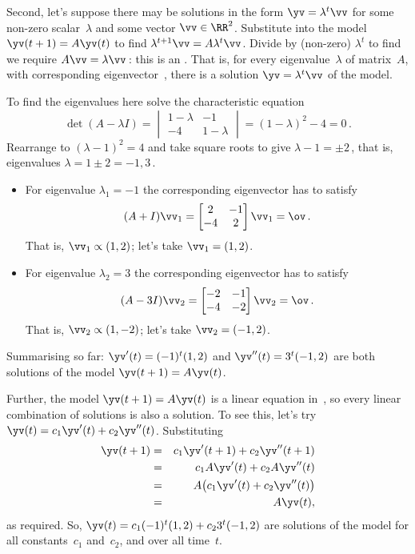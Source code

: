 \begin{example}
\begin{solution}
Second, let's suppose there may be solutions in the form \(\yv=\lambda^t\vv\) for some non-zero scalar~\(\lambda\) and some vector \(\vv\in\RR^2\).
Substitute into the model \(\yv(t+1)=A\yv(t)\) to find \(\lambda^{t+1}\vv=A\lambda^t\vv\). 
Divide by (non-zero) \(\lambda^t\) to find we require \(A\vv=\lambda\vv\)\,: this is an .
That is, for every eigenvalue~\(\lambda\) of matrix~\(A\), with corresponding eigenvector~\vv, there is a solution \(\yv=\lambda^t\vv\) of the model.

To find the eigenvalues here solve the characteristic equation 
\begin{equation*}
\det(A-\lambda I)=\begin{vmatrix} 1-\lambda&-1\\-4&1-\lambda \end{vmatrix}=(1-\lambda)^2-4=0\,.
\end{equation*}
Rearrange to \((\lambda-1)^2=4\) and take square roots to give \(\lambda-1=\pm2\)\,, that is, eigenvalues \(\lambda=1\pm2=-1,3\)\,.
\begin{itemize}
\item For eigenvalue \(\lambda_1=-1\) the corresponding eigenvector has to satisfy
\begin{equation*}
(A+I)\vv_1=\begin{bmatrix} 2&-1\\-4&2 \end{bmatrix}\vv_1=\ov\,.
\end{equation*}
That is, \(\vv_1\propto (1,2)\); let's take \(\vv_1=(1,2)\).

\item For eigenvalue \(\lambda_2=3\) the corresponding eigenvector has to satisfy
\begin{equation*}
(A-3I)\vv_2=\begin{bmatrix} -2&-1\\-4&-2 \end{bmatrix}\vv_2=\ov\,.
\end{equation*}
That is, \(\vv_2\propto (1,-2)\); let's take \(\vv_2=(-1,2)\).
\end{itemize}
Summarising so far: \(\yv'(t)=(-1)^t(1,2)\) and \(\yv''(t)=3^t(-1,2)\) are both solutions of the model \(\yv(t+1)=A\yv(t)\).

Further, the model \(\yv(t+1)=A\yv(t)\) is a linear equation in~\yv, so every linear combination of solutions is also a solution.
To see this, let's try \(\yv(t)=c_1\yv'(t)+c_2\yv''(t)\).
Substituting
\begin{eqnarray*}
\yv(t+1)&=&c_1\yv'(t+1)+c_2\yv''(t+1)
\\&=&c_1A\yv'(t)+c_2A\yv''(t)
\\&=&A\big(c_1\yv'(t)+c_2\yv''(t)\big)
\\&=&A\yv(t),
\end{eqnarray*}
as required.
So, \(\yv(t)=c_1(-1)^t(1,2)+c_23^t(-1,2)\) are solutions of the model for all constants~\(c_1\) and~\(c_2\), and over all time~\(t\).


\end{solution}
\end{example}
